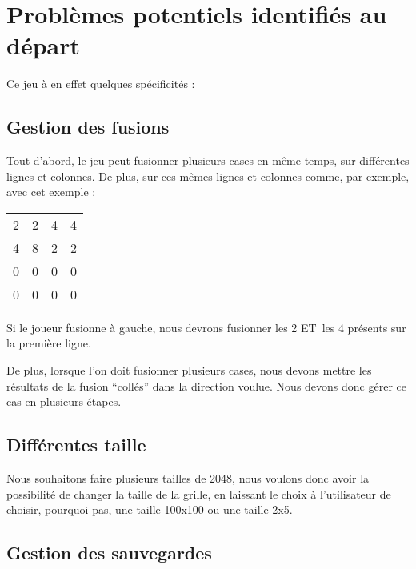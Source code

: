 \documentclass[letter]{article}
\date{\today}
\title{}
\begin{document}





\setcounter{tocdepth}{2}
\tableofcontents

\newpage


\section{Problèmes potentiels identifiés au départ}
\label{sec:orgdda6988}

Ce jeu à en effet quelques spécificités :

\subsection{Gestion des fusions}
\label{sec:org5b16100}

Tout d'abord, le jeu peut fusionner plusieurs cases en même temps, sur différentes lignes et colonnes. De plus, sur ces mêmes lignes et colonnes comme, par exemple, avec cet exemple :

\begin{center}
\begin{tabular}{rrrr}
2 & 2 & 4 & 4\\
4 & 8 & 2 & 2\\
0 & 0 & 0 & 0\\
0 & 0 & 0 & 0\\
\end{tabular}
\end{center}

Si le joueur fusionne à gauche, nous devrons fusionner les 2 ET les 4 présents sur la première ligne.

De plus, lorsque l'on doit fusionner plusieurs cases, nous devons mettre les résultats de la fusion “collés” dans la direction voulue.
Nous devons donc gérer ce cas en plusieurs étapes.

\subsection{Différentes taille}
\label{sec:org5e7ec16}

Nous souhaitons faire plusieurs tailles de 2048, nous voulons donc avoir la possibilité de changer la taille de la grille, en laissant le choix à l'utilisateur de choisir, pourquoi pas, une taille 100x100 ou une taille 2x5.

\subsection{Gestion des sauvegardes}
\label{sec:org4ed625b}
\end{document}
